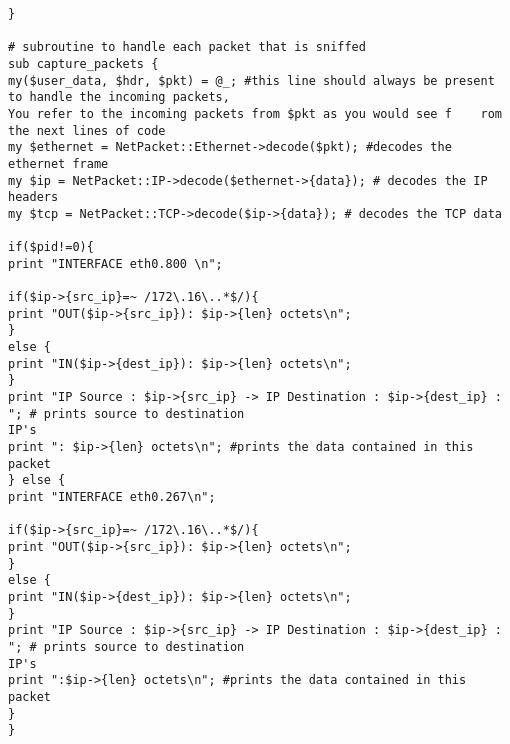 \begin{verbatim}
}
 
# subroutine to handle each packet that is sniffed
sub capture_packets {
my($user_data, $hdr, $pkt) = @_; #this line should always be present to handle the incoming packets, 
You refer to the incoming packets from $pkt as you would see f    rom the next lines of code
my $ethernet = NetPacket::Ethernet->decode($pkt); #decodes the ethernet frame
my $ip = NetPacket::IP->decode($ethernet->{data}); # decodes the IP headers
my $tcp = NetPacket::TCP->decode($ip->{data}); # decodes the TCP data 

if($pid!=0){
print "INTERFACE eth0.800 \n";

if($ip->{src_ip}=~ /172\.16\..*$/){
print "OUT($ip->{src_ip}): $ip->{len} octets\n";
}
else {
print "IN($ip->{dest_ip}): $ip->{len} octets\n";
}
print "IP Source : $ip->{src_ip} -> IP Destination : $ip->{dest_ip} : "; # prints source to destination 
IP's
print ": $ip->{len} octets\n"; #prints the data contained in this packet
} else {
print "INTERFACE eth0.267\n";
 
if($ip->{src_ip}=~ /172\.16\..*$/){
print "OUT($ip->{src_ip}): $ip->{len} octets\n";
}
else {
print "IN($ip->{dest_ip}): $ip->{len} octets\n";
}
print "IP Source : $ip->{src_ip} -> IP Destination : $ip->{dest_ip} : "; # prints source to destination 
IP's
print ":$ip->{len} octets\n"; #prints the data contained in this packet
}
}
\end{verbatim}

\newpage

